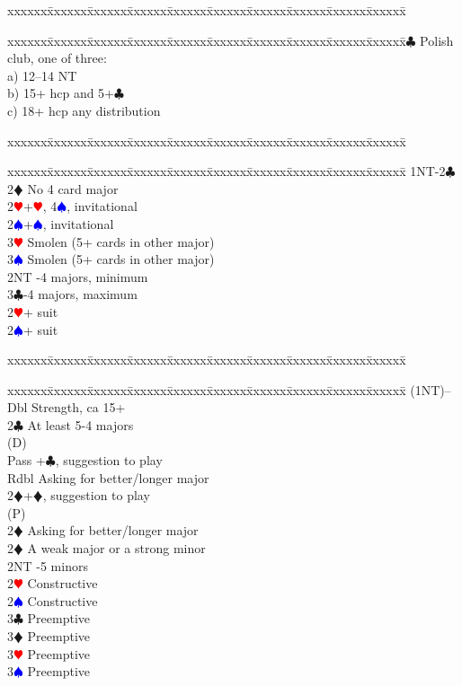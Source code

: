 \documentclass[a4paper]{article}
\newcommand{\BC}{\textcolor{OliveGreen}{$\clubsuit$}}
\newcommand{\BD}{\textcolor{RedOrange}{$\vardiamondsuit$}}
\newcommand{\BH}{\textcolor{Red}{$\varheartsuit${}}}
\newcommand{\BS}{\textcolor{Blue}{$\spadesuit${}}}
\newenvironment{bidtable}
{\begin{tabbing}

xxxxxx\=xxxxxx\=xxxxxx\=xxxxxx\=xxxxxx\=xxxxxx\=xxxxxx\=xxxxxx\=xxxxxx\=xxxxxx\=\kill}
{\end{tabbing} }%
\begin{document}
\begin{bidtable}

\end{bidtable}

\begin{bidtable}
1\BC \> Polish club, one of three:\\
\>a) 12--14 NT\\
\>b) 15+ hcp and 5+\BC \\
\>c) 18+ hcp any distribution
\end{bidtable}

\begin{bidtable}

\end{bidtable}

\begin{bidtable}
1NT-2\BC\+\\
2\BD \> No 4 card major\+\\
2\BH {}+\BH , 4\BS , invitational\\
2\BS {}+\BS , invitational\\
3\BH \> Smolen (5+ cards in other major)\\
3\BS \> Smolen (5+ cards in other major)\-\\
2NT -4 majors, minimum\\
3\BC {}-4 majors, maximum\\
2\BH {}+ suit\\
2\BS {}+ suit\-
\end{bidtable}

\begin{bidtable}

\end{bidtable}

\begin{bidtable}
(1NT)--\+\\
Dbl \> Strength, ca 15+\\
2\BC \> At least 5-4 majors\+\\
(D)\+\\
Pass +\BC , suggestion to play\\
Rdbl \> Asking for better/longer major\\
2\BD {}+\BD , suggestion to play\-\\
(P)\+\\
2\BD \> Asking for better/longer major\-\-\\
2\BD \> A weak major or a strong minor\\
2NT -5 minors\\
2\BH \> Constructive\\
2\BS \> Constructive\\
3\BC \> Preemptive\\
3\BD \> Preemptive\\
3\BH \> Preemptive\\
3\BS \> Preemptive\-
\end{bidtable}
\end{document}
